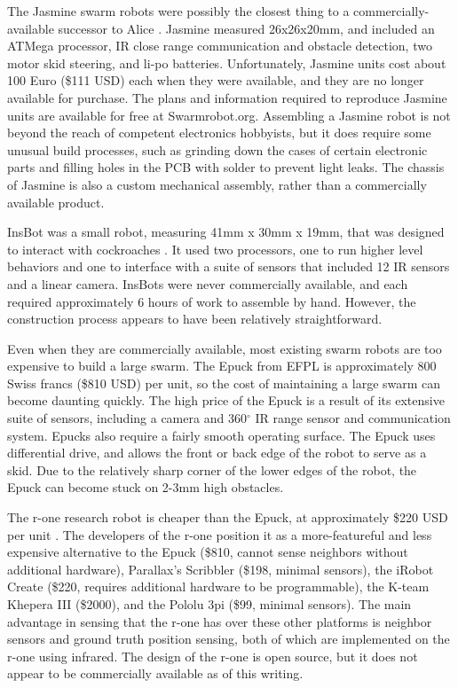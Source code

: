 \documentclass[]{article}
\begin{document}
The Jasmine swarm robots were possibly the closest thing to a commercially-available successor to Alice  \cite{kernbach2011swarmrobot}.
Jasmine measured 26x26x20mm, and included an ATMega processor, IR close range communication and obstacle detection, two motor skid steering, and li-po batteries.
Unfortunately, Jasmine units cost about 100 Euro (\$111 USD) each when they were available, and they are no longer available for purchase. 
The plans and information required to reproduce Jasmine units are available for free at Swarmrobot.org.
Assembling a Jasmine robot is not beyond the reach of competent electronics hobbyists, but it does require some unusual build processes, such as grinding down the cases of certain electronic parts and filling holes in the PCB with solder to prevent light leaks. 
The chassis of Jasmine is also a custom mechanical assembly, rather than a commercially available product. 

InsBot was a small robot, measuring 41mm x 30mm x 19mm, that was designed to interact with cockroaches \cite{colot2004insbot}.
It used two processors, one to run higher level behaviors and one to interface with a suite of sensors that included 12 IR sensors and a linear camera. 
InsBots were never commercially available, and each required approximately 6 hours of work to assemble by hand. 
However, the construction process appears to have been relatively straightforward. 

Even when they are commercially available, most existing swarm robots are too expensive to build a large swarm.
The Epuck from EFPL is approximately 800 Swiss francs (\$810 USD) per unit, so the cost of maintaining a large swarm can become daunting quickly. 
The high price of the Epuck is a result of its extensive suite of sensors, including a camera and 360$^{\circ}$ IR range sensor and communication system. 
Epucks also require a fairly smooth operating surface.
The Epuck uses differential drive, and allows the front or back edge of the robot to serve as a skid. 
Due to the relatively sharp corner of the lower edges of the robot, the Epuck can become stuck on 2-3mm high obstacles. 

The r-one research robot is cheaper than the Epuck, at approximately \$220 USD per unit \cite{mclurkin2013low}. 
The developers of the r-one position it as a more-featureful and less expensive alternative to the Epuck (\$810, cannot sense neighbors without additional hardware), Parallax's Scribbler (\$198, minimal sensors), the iRobot Create (\$220, requires additional hardware to be programmable), the K-team Khepera III (\$2000), and the Pololu 3pi (\$99, minimal sensors). The main advantage in sensing that the r-one has over these other platforms is neighbor sensors and ground truth position sensing, both of which are implemented on the r-one using infrared.
The design of the r-one is open source, but it does not appear to be commercially available as of this writing.   
\end{document}
